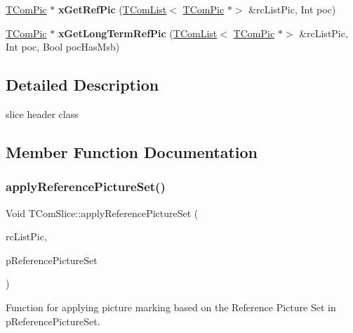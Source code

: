 \begin{DoxyCompactItemize}
\hyperlink{class_t_com_pic}{T\+Com\+Pic} $\ast$ {\bfseries x\+Get\+Ref\+Pic} (\hyperlink{class_t_com_list}{T\+Com\+List}$<$ \hyperlink{class_t_com_pic}{T\+Com\+Pic} $\ast$$>$ \&rc\+List\+Pic, Int poc)
\item 
\mbox{\label{class_t_com_slice_a90305188aae89b2148de13c4aa1a284c}} 
\hyperlink{class_t_com_pic}{T\+Com\+Pic} $\ast$ {\bfseries x\+Get\+Long\+Term\+Ref\+Pic} (\hyperlink{class_t_com_list}{T\+Com\+List}$<$ \hyperlink{class_t_com_pic}{T\+Com\+Pic} $\ast$$>$ \&rc\+List\+Pic, Int poc, Bool poc\+Has\+Msb)
\end{DoxyCompactItemize}


\subsection{Detailed Description}
slice header class 

\subsection{Member Function Documentation}
\mbox{\label{class_t_com_slice_af77420f65101545300fbb008b6304b7a}} 
\subsubsection{\texorpdfstring{apply\+Reference\+Picture\+Set()}{applyReferencePictureSet()}}
{\footnotesize\ttfamily Void T\+Com\+Slice\+::apply\+Reference\+Picture\+Set (\begin{DoxyParamCaption}\item[{\hyperlink{class_t_com_list}{T\+Com\+List}$<$ \hyperlink{class_t_com_pic}{T\+Com\+Pic} $\ast$$>$ \&}]{rc\+List\+Pic,  }\item[{const \hyperlink{class_t_com_reference_picture_set}{T\+Com\+Reference\+Picture\+Set} $\ast$}]{p\+Reference\+Picture\+Set }\end{DoxyParamCaption})}

Function for applying picture marking based on the Reference Picture Set in p\+Reference\+Picture\+Set. \mbox{\label{class_t_com_slice_a7e209d103c42543b321bd2c370749d43}} 
